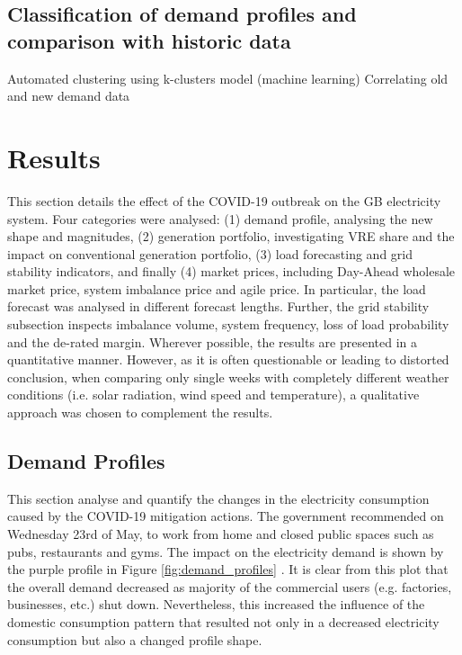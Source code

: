\documentclass[energies,article,submit,moreauthors,pdftex]{Definitions/mdpi}
\begin{document}
\subsection{Classification of demand profiles and comparison with historic data}
Automated clustering using k-clusters model (machine learning)
Correlating old and new demand data


\section{Results}
This section details the effect of the COVID-19 outbreak on the GB electricity system. Four categories were analysed: (1) demand profile, analysing the new shape and magnitudes, (2) generation portfolio, investigating VRE share and the impact on conventional generation portfolio, (3) load forecasting and grid stability indicators, and finally (4) market prices, including Day-Ahead wholesale market price, system imbalance price and agile price. In particular, the load forecast was analysed in different forecast lengths. Further, the grid stability subsection inspects imbalance volume, system frequency, loss of load probability and the de-rated margin. Wherever possible, the results are presented in a quantitative manner. However, as it is often questionable or leading to distorted conclusion, when comparing only single weeks with completely different weather conditions (i.e. solar radiation, wind speed and temperature), a qualitative approach was chosen to complement the results.


\subsection{Demand Profiles}\label{section: Effect on demand profile}

This section analyse and quantify the changes in the electricity consumption caused by the COVID-19 mitigation actions. The government recommended on Wednesday 23rd of May, to work from home and closed public spaces such as pubs, restaurants and gyms. The impact on the electricity demand is shown by the purple profile in Figure \ref{fig:demand_profiles} \cite{GovernmentGOV.UK}. It is clear from this plot that the overall demand decreased as majority of the commercial users (e.g. factories, businesses, etc.) shut down. Nevertheless, this increased the influence of the domestic consumption pattern that resulted not only in a decreased electricity consumption but also a changed profile shape.
\end{document}
